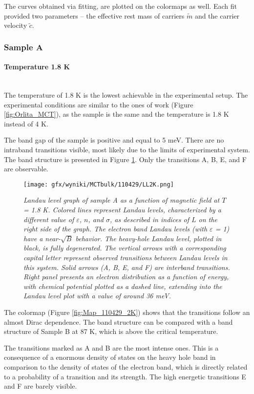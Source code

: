 \documentclass[titlepage,a4paper]{book}
\newcommand{\wciecie}{\quad\phantom{v}}
\newcommand{\myparagraph}[1]{\paragraph{#1}\mbox{}\\}
\begin{document}
The curves obtained via fitting, are plotted on the colormaps as well. Each fit provided two parameters -- the effective rest mass of carriers $\tilde{m}$ and the carrier velocity $\tilde{c}$.

\subsubsection{Sample A}
\myparagraph{Temperature 1.8 K}
\wciecie
The temperature of 1.8 K is the lowest achievable in the experimental setup. The experimental conditions are similar to the ones of work \cite{Orlita_MCT} (Figure \ref{fig:Orlita_MCT}), as the sample is the same and the temperature is 1.8 K instead of 4 K.

The band gap of the sample is positive and equal to 5 meV. There are no intraband transitions visible, most likely due to the limits of experimental system. The band structure is presented in Figure \ref{fig:LL_110429_2K}. Only the transitions A, B, E, and F are observable.

\begin{figure}[ht]
	\centering
	\texttt{[image: gfx/wyniki/MCTbulk/110429/LL2K.png]}
	\vspace{-10pt}
	\caption{\textit{Landau level graph of sample A as a function of magnetic field at $T$ = 1.8 K. Colored lines represent Landau levels, characterized by a different value of $\varepsilon$, $n$, and $\sigma$, as described in indices of $L$ on the right side of the graph. The electron band Landau levels (with $\varepsilon$ = 1) have a near-$\sqrt{B}$ behavior. The heavy-hole Landau level, plotted in black, is fully degenerated. The vertical arrows with a corresponding capital letter represent observed transitions between Landau levels in this system. Solid arrows (A, B, E, and F) are interband transitions. Right panel presents an electron distribution as a function of energy, with chemical potential plotted as a dashed line, extending into the Landau level plot with a value of around 36 meV.}}
	\label{fig:LL_110429_2K}
\end{figure}
The colormap (Figure \ref{fig:Map_110429_2K}) shows that the transitions follow an almost Dirac dependence. The band structure can be compared with a band structure of Sample B at 87 K, which is above the critical temperature. 

The transitions marked as A and B are the most intense ones. This is a consequence of a enormous density of states on the heavy hole band in comparison to the density of states of the electron band, which is directly related to a probability of a transition and its strength. The high energetic transitions E and F are barely visible.
\end{document}

